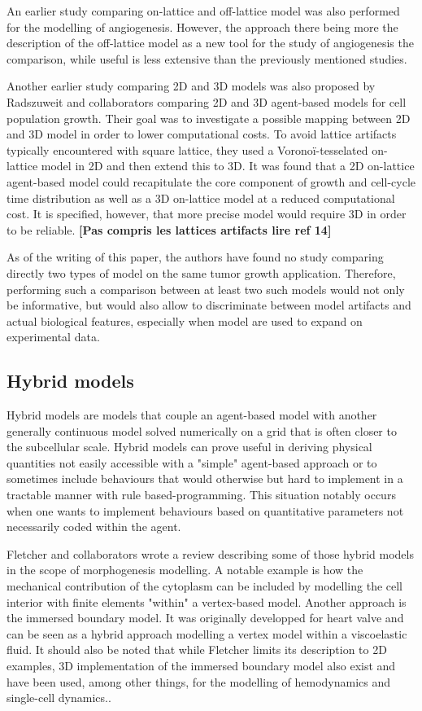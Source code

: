 \documentclass[11pt,a4paper]{article}
\begin{document}
An earlier study comparing on-lattice and off-lattice model was also performed for the modelling of angiogenesis. \cite{Plank2004} However, the approach there being more the description of the off-lattice model as a new tool for the study of angiogenesis the comparison, while useful is less extensive than the previously mentioned studies.

Another earlier study comparing 2D and 3D models was also proposed by Radszuweit and collaborators comparing 2D and 3D agent-based models for cell population growth. Their goal was to investigate a possible mapping between 2D and 3D model in order to lower computational costs.\cite{Rads2009} To avoid lattice artifacts typically encountered with square lattice, they used a Voronoï-tesselated on-lattice model in 2D and then extend this to 3D. It was found that a 2D on-lattice agent-based model could recapitulate the core component of growth and cell-cycle time distribution as well as a 3D on-lattice model at a reduced computational cost. It is specified, however, that more precise model would require 3D in order to be reliable. \textbf{[Pas compris les lattices artifacts lire ref 14]}

As of the writing of this paper, the authors have found no study comparing directly two types of model on the same tumor growth application. Therefore, performing such a comparison between at least two such models would not only be informative, but would also allow to discriminate between model artifacts and actual biological features, especially when model are used to expand on experimental data.

\subsection{Hybrid models}
Hybrid models are models that couple an agent-based model with another generally continuous model solved numerically on a grid that is often closer to the subcellular scale. Hybrid models can prove useful in deriving physical quantities not easily accessible with a "simple" agent-based approach or to sometimes include behaviours that would otherwise but hard to implement in a tractable manner with rule based-programming. This situation notably occurs when one wants to implement behaviours based on quantitative parameters not necessarily coded within the agent.

Fletcher and collaborators wrote a review describing some of those hybrid models in the scope of morphogenesis modelling\cite{Fletcher2017}. A notable example is how the mechanical contribution of the cytoplasm can be included by modelling the cell interior with finite elements "within" a vertex-based model. Another approach is the immersed boundary model. It was originally developped for heart valve and can be seen as a hybrid approach modelling a vertex model within a viscoelastic fluid.  It should also be noted that while Fletcher limits its description to 2D examples, 3D implementation of the immersed boundary model also exist and have been used, among other things, for the modelling of hemodynamics and single-cell dynamics.\cite{Ames2020}\cite{Guyot2016}\cite{Muller2021}. 
\end{document}
